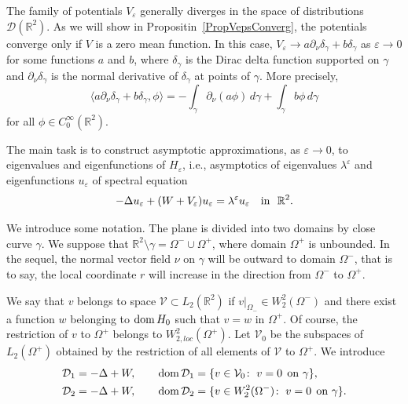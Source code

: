 \documentclass[reqno]{amsart}
\theoremstyle{plain}
\numberwithin{equation}{section}
\newcommand{\dom}{\mathop{\rm dom}}
\newcommand{\Real}{\mathbb R}
\newcommand{\eps}{\varepsilon}
\newcommand{\rd}[1]{{\color{red}{#1}}}
\newcommand{\npt}{\partial_\nu}
\begin{document}
The family of potentials $V_\eps$ generally diverges in the space of distributions $\mathcal{D}(\Real^2)$.
As we will show  in Propositin~\ref{PropVepsConverg},
the  potentials converge only if $V$ is a zero mean function. In this case,
$V_\eps\to a \partial_\nu\delta_\gamma+b\delta_\gamma$ as $\eps\to 0$ for some functions $a$ and $b$,
where $\delta_\gamma$ is the Dirac delta function supported on $\gamma$ and $\partial_\nu\delta_\gamma$ is the normal derivative of $\delta_\gamma$ at points of $\gamma$. More precisely,
\begin{equation*}
  \langle a\partial_\nu\delta_\gamma+b \delta_\gamma, \phi \rangle= -\int_\gamma  \npt(a\phi)\,d\gamma+\int_\gamma b \phi\,d\gamma
\end{equation*}
for all $\phi\in C^\infty_0(\Real^2)$.



The main task is to construct asymptotic approximations, as $\eps\to 0$, to eigenvalues  and eigenfunctions of $H_\eps$, i.e., asymptotics of eigenvalues $\lambda^\eps$ and eigenfunctions $u_\eps$ of spectral equation
\begin{equation}\label{SpectralEqn}
-\Delta u_\eps +(W+V_\eps) u_\eps= \lambda^\eps u_\eps\quad \hbox{in \ } \Real^2.
\end{equation}





We  introduce some notation. The plane is divided into two domains by close curve $\gamma$.  We suppose that $\Real^2\setminus\gamma=\Omega^-\cup\Omega^+$, where domain $\Omega^+$ is unbounded.
In the sequel, the normal vector field $\nu$ on $\gamma$ will be outward to domain $\Omega^-$, that is to say, the local coordinate $r$ will increase in the direction from $\Omega^-$ to $\Omega^+$.




We say that $v$ belongs to space $\mathcal{V}\subset L_2(\Real^2)$ if $v|_{\Omega_-}\in W_2^2(\Omega^-)$ and there exist a function $w$ belonging to $\dom H_0$ such that $v=w$ in $\Omega^+$. Of course, the restriction of $v$ to $\Omega^+$ belongs to $W_{2,loc}^2(\Omega^+)$. Let $\mathcal{V}_0$ be the subspaces of $L_2(\Omega^+)$ obtained by the restriction of all elements of $\mathcal{V}$ to $\Omega^+$.   We introduce \rd{two operators (in the spaces?)}
\begin{align*}
&\mathcal{D}_1= -\Delta+W, \qquad \dom \mathcal{D}_1=\{v\in \mathcal{V}_0\colon\; v=0 \;\,\mbox{on } \gamma\},\\
&\mathcal{D}_2= -\Delta+W, \qquad \dom \mathcal{D}_2=\{v\in W_2^2(\Omega^-)\colon\; v=0 \;\,\mbox{on } \gamma\}.
\end{align*}
\end{document}
